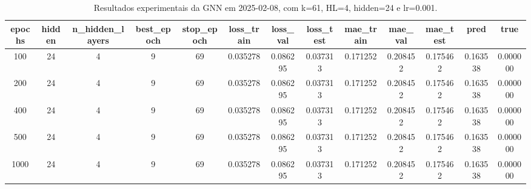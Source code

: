 \begin{table}[h]
\centering
\caption{Resultados experimentais da GNN em 2025-02-08, com k=61, HL=4, hidden=24 e lr=0.001.}
\label{tab:gnn_results_k61_hl4_h24_d20250208}
\begin{tabular}{ccccccccccccc}
\toprule
epochs & hidden & n\_hidden\_layers & best\_epoch & stop\_epoch & loss\_train & loss\_val & loss\_test & mae\_train & mae\_val & mae\_test & pred & true \\
\midrule
100 & 24 & 4 & 9 & 69 & 0.035278 & 0.086295 & 0.037313 & 0.171252 & 0.208452 & 0.175462 & 0.163538 & 0.000000 \\
200 & 24 & 4 & 9 & 69 & 0.035278 & 0.086295 & 0.037313 & 0.171252 & 0.208452 & 0.175462 & 0.163538 & 0.000000 \\
400 & 24 & 4 & 9 & 69 & 0.035278 & 0.086295 & 0.037313 & 0.171252 & 0.208452 & 0.175462 & 0.163538 & 0.000000 \\
500 & 24 & 4 & 9 & 69 & 0.035278 & 0.086295 & 0.037313 & 0.171252 & 0.208452 & 0.175462 & 0.163538 & 0.000000 \\
1000 & 24 & 4 & 9 & 69 & 0.035278 & 0.086295 & 0.037313 & 0.171252 & 0.208452 & 0.175462 & 0.163538 & 0.000000 \\
\bottomrule
\end{tabular}
\end{table}
